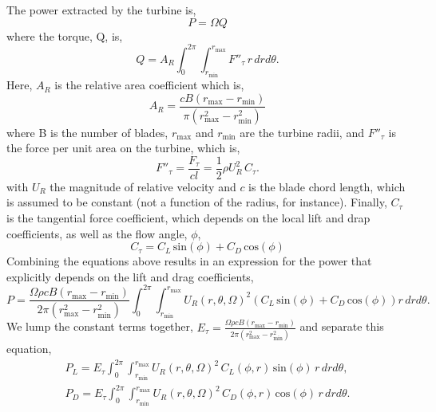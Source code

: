 The power extracted by the turbine is, 
\begin{equation}
 P = \Omega Q
\end{equation}
where the torque, Q, is, 
\begin{equation}
 Q = A_R \int_0^{2\pi} \int_{r_{\text{min}}}^{r_{\text{max}}} F''_{\tau}\, r\, dr d\theta.
\end{equation}
Here, $A_R$ is the relative area coefficient which is, 
\begin{equation}
A_R = \frac{c B (r_{\text{max}}-r_{\text{min}})}{\pi(r_{\text{max}}^2-r_{\text{min}}^2)}
\end{equation}
where B is the number of blades, $r_{\text{max}}$ and $r_{\text{min}}$
are the turbine radii, and $F''_{\tau}$ is the force per unit
area on the turbine, which is, 
\begin{equation}
 F''_{\tau} = \frac{F_{\tau}}{cl}= \frac{1}{2}\rho U_R^2 \, C_{\tau}.
\end{equation}
with $U_R$ the magnitude of relative velocity and $c$ is the blade chord
length, which is assumed to be constant (not a function of the radius,
for instance). Finally, $C_{\tau}$ is the tangential force coefficient,
which depends on the local lift and drap coefficients, as well as the
flow angle, $\phi$, 
\begin{equation}
 C_{\tau} = C_L \,\text{sin}(\phi) + C_D \,\text{cos}(\phi)
\end{equation}
Combining the equations above results in an expression for the power
that explicitly depends on the lift and drag coefficients, 
\begin{equation*}
 P = \frac{\Omega \rho c B (r_{\text{max}}-r_{\text{min}})}{2 \pi(r_{\text{max}}^2-r_{\text{min}}^2)}
\int_0^{2\pi}
\int_{r_{\text{min}}}^{r_{\text{max}}} U_R(r,\theta,\Omega)^2 \left(C_L
						     \,\text{sin}(\phi)
						     + C_D
						     \,\text{cos}(\phi)
						    \right) r\,dr d\theta. 
\end{equation*}
We lump the constant terms together, $E_{\tau} = \frac{\Omega \rho c B (r_{\text{max}}-r_{\text{min}})}{2 \pi(r_{\text{max}}^2-r_{\text{min}}^2)}$ and separate this equation, 
\begin{align}
 P_L = E_\tau
 \int_0^{2\pi}
  \int_{r_{\text{min}}}^{r_{\text{max}}} U_R(r,\theta,\Omega)^2 \, C_L(\phi,r)
 \,\text{sin}(\phi)\, r\,dr d\theta,  \label{lift} \\
 P_D = E_\tau
 \int_0^{2\pi}
  \int_{r_{\text{min}}}^{r_{\text{max}}} U_R(r,\theta,\Omega)^2 \, C_D(\phi,r) \,\text{cos}(\phi)\, r\,dr d\theta. \label{drag}
\end{align}
